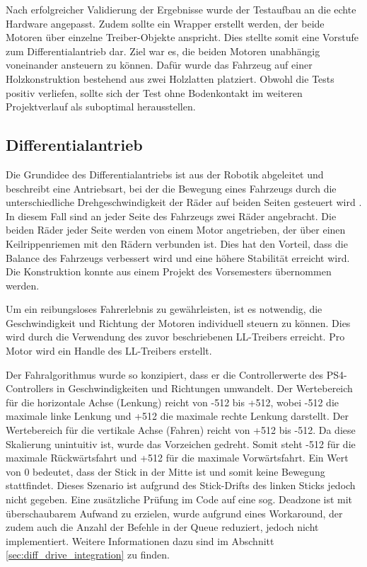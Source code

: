 Nach erfolgreicher Validierung der Ergebnisse wurde der Testaufbau an die echte Hardware angepasst. Zudem sollte ein Wrapper erstellt werden, der beide Motoren über einzelne Treiber-Objekte anspricht. Dies stellte somit eine Vorstufe zum Differentialantrieb dar. Ziel war es, die beiden Motoren unabhängig voneinander ansteuern zu können. Dafür wurde das Fahrzeug auf einer Holzkonstruktion bestehend aus zwei Holzlatten platziert. Obwohl die Tests positiv verliefen, sollte sich der Test ohne Bodenkontakt im weiteren Projektverlauf als suboptimal herausstellen.

\subsection{Differentialantrieb}

Die Grundidee des Differentialantriebs ist aus der Robotik abgeleitet und beschreibt eine Antriebsart, bei der die Bewegung eines Fahrzeugs durch die unterschiedliche Drehgeschwindigkeit der Räder auf beiden Seiten gesteuert wird \cite{design_and_control_for_differential_drive_mobile_robot}. In diesem Fall sind an jeder Seite des Fahrzeugs zwei Räder angebracht. Die beiden Räder jeder Seite werden von einem Motor angetrieben, der über einen Keilrippenriemen mit den Rädern verbunden ist. Dies hat den Vorteil, dass die Balance des Fahrzeugs verbessert wird und eine höhere Stabilität erreicht wird. Die Konstruktion konnte aus einem Projekt des Vorsemesters übernommen werden. \newline

Um ein reibungsloses Fahrerlebnis zu gewährleisten, ist es notwendig, die Geschwindigkeit und Richtung der Motoren individuell steuern zu können. Dies wird durch die Verwendung des zuvor beschriebenen LL-Treibers erreicht. Pro Motor wird ein Handle des LL-Treibers erstellt. \newline

Der Fahralgorithmus wurde so konzipiert, dass er die Controllerwerte des PS4-Controllers in Geschwindigkeiten und Richtungen umwandelt. Der Wertebereich für die horizontale Achse (Lenkung) reicht von -512 bis +512, wobei -512 die maximale linke Lenkung und +512 die maximale rechte Lenkung darstellt. Der Wertebereich für die vertikale Achse (Fahren) reicht von +512 bis -512. Da diese Skalierung unintuitiv ist, wurde das Vorzeichen gedreht. Somit steht -512 für die maximale Rückwärtsfahrt und +512 für die maximale Vorwärtsfahrt. Ein Wert von 0 bedeutet, dass der Stick in der Mitte ist und somit keine Bewegung stattfindet. Dieses Szenario ist aufgrund des Stick-Drifts des linken Sticks jedoch nicht gegeben. Eine zusätzliche Prüfung im Code auf eine sog. Deadzone ist mit überschaubarem Aufwand zu erzielen, wurde aufgrund eines Workaround, der zudem auch die Anzahl der Befehle in der Queue reduziert, jedoch nicht implementiert. Weitere Informationen dazu sind im Abschnitt \ref{sec:diff_drive_integration} zu finden. \newline

